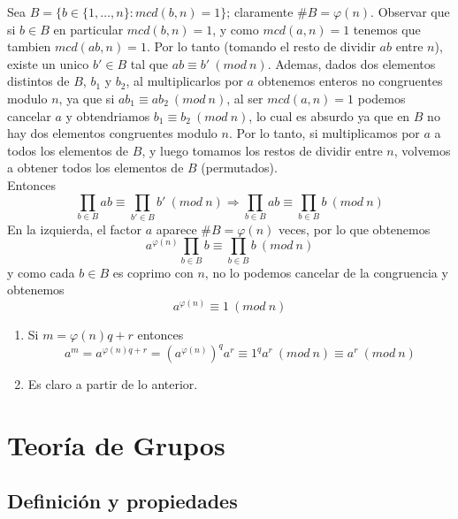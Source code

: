 \documentclass{report}
\begin{document}
\begin{myproof}
    Sea $B=\{b\in\{1,\dots,n\}:mcd(b,n)=1\}$; claramente $\#B=\varphi(n)$. Observar que si $b\in B$ en particular $mcd(b,n)=1$, y como $mcd(a,n)=1$ tenemos que tambien $mcd(ab,n)=1$. Por lo tanto (tomando el resto de dividir $ab$ entre $n$), existe un unico $b'\in B$ tal que $ab\equiv b'\ (mod\ n)$. Ademas, dados dos elementos distintos de $B$, $b_1$ y $b_2$, al multiplicarlos por $a$ obtenemos enteros no congruentes modulo $n$, ya que si $ab_1\equiv ab_2\ (mod\ n)$, al ser $mcd(a,n)=1$ podemos cancelar $a$ y obtendriamos $b_1\equiv b_2\ (mod\ n)$, lo cual es absurdo ya que en $B$ no hay dos elementos congruentes modulo $n$. Por lo tanto, si multiplicamos por $a$ a todos los elementos de $B$, y luego tomamos los restos de dividir entre $n$, volvemos a obtener todos los elementos de $B$ (permutados).\\Entonces $$\prod _{b\in B} ab\equiv \prod _{b'\in B} b'\ ( mod\ n) \Rightarrow \prod _{b\in B} ab\equiv \prod _{b\in B} b\ ( mod\ n)$$En la izquierda, el factor $a$ aparece $\#B=\varphi(n)$ veces, por lo que obtenemos$$a^{\varphi ( n)}\prod _{b\in B} b\equiv \prod _{b\in B} b\ ( mod\ n)$$y como cada $b\in B$ es coprimo con $n$, no lo podemos cancelar de la congruencia y obtenemos$$a^{\varphi(n)}\equiv 1\ (mod\ n)$$
\end{myproof}
\begin{myproof}
    \begin{enumerate}
    \item Si $m=\varphi(n)q+r$ entonces $$a^m=a^{\varphi(n)q+r}=\left( a^{\varphi(n)} \right)^q a^r\equiv 1^qa^r\ (mod\ n)\equiv a^r\ (mod\ n) $$
            \item Es claro a partir de lo anterior.
    \end{enumerate}
\end{myproof}\newpage\chapter{Teoría de Grupos}\section{Definición y propiedades}
\end{document}

